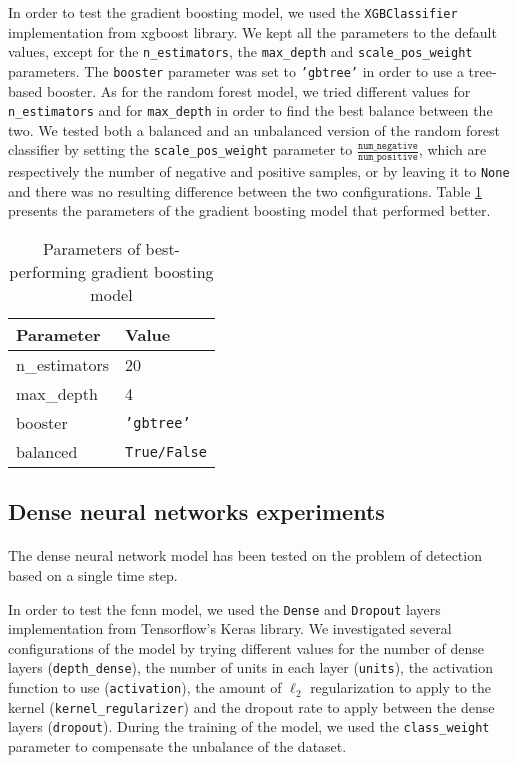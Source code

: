 In order to test the gradient boosting model, we used the \texttt{XGBClassifier} implementation from xgboost library. We kept all the parameters to the default values, except for the \texttt{n\_estimators}, the \texttt{max\_depth} and \texttt{scale\_pos\_weight} parameters. The \texttt{booster} parameter was set to \texttt{'gbtree'} in order to use a tree-based booster. As for the random forest model, we tried different values for \texttt{n\_estimators} and for \texttt{max\_depth} in order to find the best balance between the two. We tested both a balanced and an unbalanced version of the random forest classifier by setting the \texttt{scale\_pos\_weight} parameter to $\frac{\texttt{num\_negative}}{\texttt{num\_positive}}$, which are respectively the number of negative and positive samples, or by leaving it to \texttt{None} and there was no resulting difference between the two configurations. Table \ref{tab:gradientboosting_param} presents the parameters of the gradient boosting model that performed better.
\begin{table}[htbp]
    \centering
    \begin{tabular}{ll}
        \hline
        \textbf{Parameter}  & \textbf{Value} \\\hline
        n\_estimators       & 20 \\
        max\_depth          & 4 \\
        booster             & \texttt{'gbtree'} \\
        balanced            & \texttt{True/False} \\\hline
    \end{tabular}
    \caption{Parameters of best-performing gradient boosting model}
    \label{tab:gradientboosting_param}
\end{table}

\subsection{Dense neural networks experiments}
\paragraph{} The dense neural network model has been tested on the problem of detection based on a single time step.

In order to test the \acs{fcnn} model, we used the \texttt{Dense} and \texttt{Dropout} layers implementation from Tensorflow's Keras library. We investigated several configurations of the model by trying different values for the number of dense layers (\texttt{depth\_dense}), the number of units in each layer (\texttt{units}), the activation function to use (\texttt{activation}), the amount of $\ell_2$ regularization to apply to the kernel (\texttt{kernel\_regularizer}) and the dropout rate to apply between the dense layers (\texttt{dropout}). During the training of the model, we used the \texttt{class\_weight} parameter to compensate the unbalance of the dataset.

